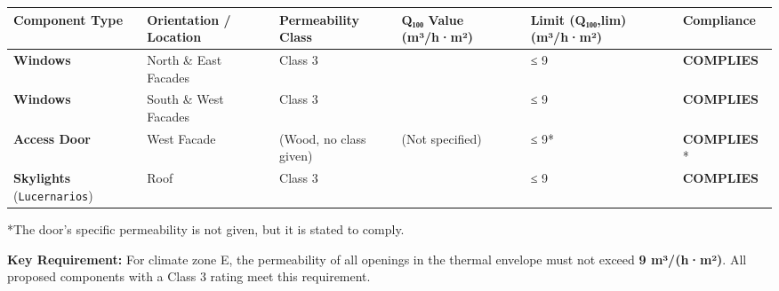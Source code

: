 \documentclass[
  10pt,
  letterpaper,
]{scrbook}
\begin{document}
\begin{longtable}[]{@{}
  >{\raggedright\arraybackslash}p{}
  >{\raggedright\arraybackslash}p{}
  >{\raggedright\arraybackslash}p{}
  >{\raggedright\arraybackslash}p{}
  >{\raggedright\arraybackslash}p{}
  >{\raggedright\arraybackslash}p{}@{}}
\toprule\noalign{}
\begin{minipage}[b]{\linewidth}\raggedright
Component Type
\end{minipage} & \begin{minipage}[b]{\linewidth}\raggedright
Orientation / Location
\end{minipage} & \begin{minipage}[b]{\linewidth}\raggedright
Permeability Class
\end{minipage} & \begin{minipage}[b]{\linewidth}\raggedright
Q₁₀₀ Value (m³/h·m²)
\end{minipage} & \begin{minipage}[b]{\linewidth}\raggedright
Limit (Q₁₀₀,lim) (m³/h·m²)
\end{minipage} & \begin{minipage}[b]{\linewidth}\raggedright
Compliance
\end{minipage} \\
\midrule\noalign{}
\endhead
\bottomrule\noalign{}
\endlastfoot
\textbf{Windows} & North \& East Facades & Class 3 & 9 & ≤ 9 &
\textbf{COMPLIES} \\
\textbf{Windows} & South \& West Facades & Class 3 & 9 & ≤ 9 &
\textbf{COMPLIES} \\
\textbf{Access Door} & West Facade & (Wood, no class given) & (Not
specified) & ≤ 9* & \textbf{COMPLIES} * \\
\textbf{Skylights} (\texttt{Lucernarios}) & Roof & Class 3 & 9 & ≤ 9 &
\textbf{COMPLIES} \\
\end{longtable}

*The door's specific permeability is not given, but it is stated to
comply.

\textbf{Key Requirement:} For climate zone E, the permeability of all
openings in the thermal envelope must not exceed \textbf{9 m³/(h·m²)}.
All proposed components with a Class 3 rating meet this requirement.
\end{document}
